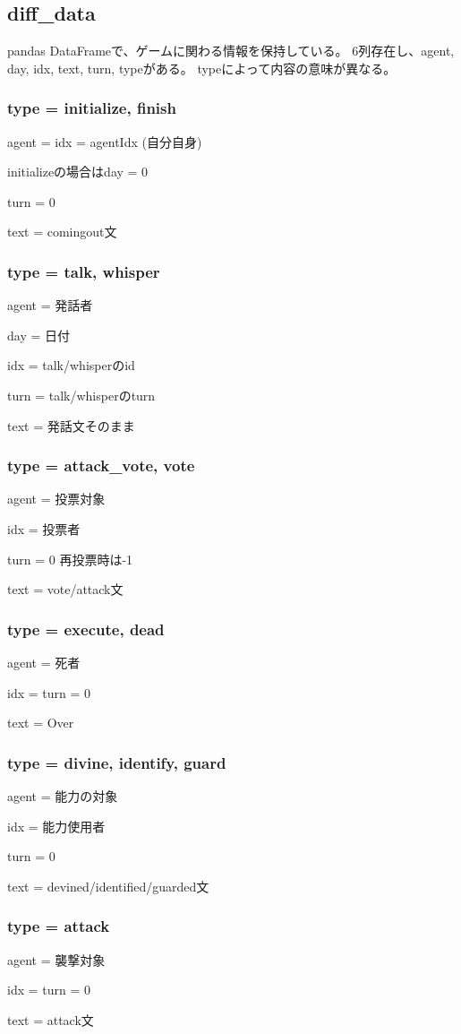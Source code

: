 \documentclass[a4j,twocolumn]{jarticle}
\begin{document}
  \subsection{diff\_data}
    pandas DataFrameで、ゲームに関わる情報を保持している。
    6列存在し、{agent, day, idx, text, turn, type}がある。
    typeによって内容の意味が異なる。
    \subsubsection{type = initialize, finish}
      agent = idx = agentIdx (自分自身) \par
      initializeの場合はday = 0 \par
      turn = 0 \par
      text = comingout文 \par
    \subsubsection{type = talk, whisper}
      agent = 発話者 \par
      day = 日付 \par
      idx = talk/whisperのid \par
      turn = talk/whisperのturn \par
      text = 発話文そのまま
    \subsubsection{type = attack\_vote, vote}
      agent = 投票対象 \par
      idx = 投票者 \par
      turn = 0 再投票時は-1 \par
      text = vote/attack文
    \subsubsection{type = execute, dead}
      agent = 死者 \par
      idx = turn = 0 \par
      text = Over
    \subsubsection{type = divine, identify, guard}
      agent = 能力の対象 \par
      idx = 能力使用者 \par
      turn = 0 \par
      text = devined/identified/guarded文
    \subsubsection{type = attack}
      agent = 襲撃対象 \par
      idx = turn = 0 \par
      text = attack文
\end{document}
